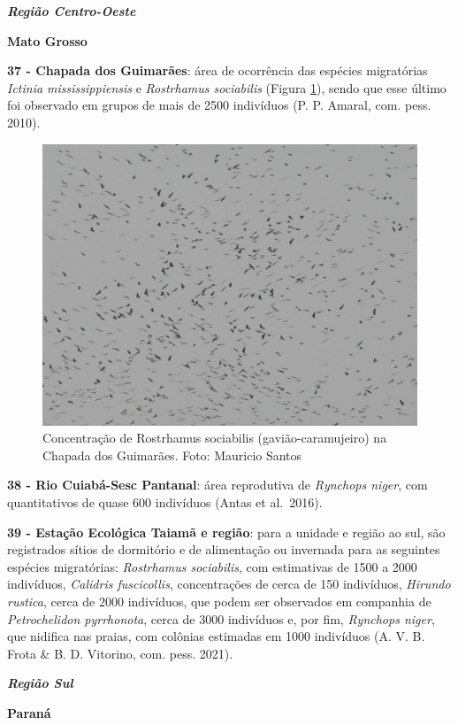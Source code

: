 \documentclass[
  oneside]{scrbook}
\begin{document}
\textbf{\emph{Região Centro-Oeste}}

\textbf{Mato Grosso}

\textbf{37 - Chapada dos Guimarães}: área de ocorrência das espécies migratórias \emph{Ictinia mississippiensis} e \emph{Rostrhamus sociabilis} (Figura \ref{fig:26}), sendo que esse último foi observado em grupos de mais de 2500 indivíduos (P. P. Amaral, com. pess. 2010).

\begin{figure}[H]

{\centering \includegraphics[width=0.75\linewidth]{imagens/cap07/Figura_7.6} 

}

\caption{Concentração de Rostrhamus sociabilis (gavião-caramujeiro) na Chapada dos Guimarães. Foto: Mauricio Santos}\label{fig:26}
\end{figure}

\textbf{38 - Rio Cuiabá-Sesc Pantanal}: área reprodutiva de \emph{Rynchops niger}, com quantitativos de quase 600 indivíduos (Antas et al.~2016).

\textbf{39 - Estação Ecológica Taiamã e região}: para a unidade e região ao sul, são registrados sítios de dormitório e de alimentação ou invernada para as seguintes espécies migratórias: \emph{Rostrhamus sociabilis}, com estimativas de 1500 a 2000 indivíduos, \emph{Calidris fuscicollis}, concentrações de cerca de 150 indivíduos, \emph{Hirundo rustica}, cerca de 2000 indivíduos, que podem ser observados em companhia de \emph{Petrochelidon pyrrhonota}, cerca de 3000 indivíduos e, por fim, \emph{Rynchops niger}, que nidifica nas praias, com colônias estimadas em 1000 indivíduos (A. V. B. Frota \& B. D. Vitorino, com. pess. 2021).

\textbf{\emph{Região Sul}}

\textbf{Paraná}
\end{document}
